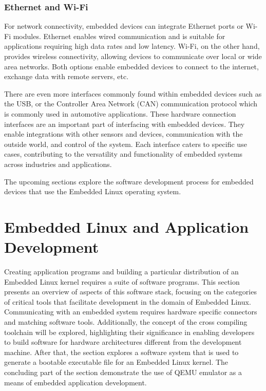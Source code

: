\subsubsection{Ethernet and Wi-Fi}

For network connectivity, embedded devices can integrate Ethernet ports or Wi-Fi modules. Ethernet enables wired communication and is suitable for applications requiring high data rates and low latency. Wi-Fi, on the other hand, provides wireless connectivity, allowing devices to communicate over local or wide area networks. Both options enable embedded devices to connect to the internet, exchange data with remote servers, etc.

There are even more interfaces commonly found within embedded devices such as the USB, or the Controller Area Network (CAN) communication protocol which is commonly used in automotive applications. These hardware connection interfaces are an important part of interfacing with embedded devices. They enable integrations with other sensors and devices, communication with the outside world, and control of the system. Each interface caters to specific use cases, contributing to the versatility and functionality of embedded systems across industries and applications.

The upcoming sections explore the software development process for embedded devices that use the Embedded Linux operating system.

\section{Embedded Linux and Application Development}

Creating application programs and building a particular distribution of an Embedded Linux kernel requires a suite of software programs. This section presents an overview of aspects of this software stack, focusing on the categories of critical tools that facilitate development in the domain of Embedded Linux. Communicating with an embedded system requires hardware specific connectors and matching software tools. Additionally, the concept of the cross compiling toolchain will be explored, highlighting their significance in enabling developers to build software for hardware architectures different from the development machine. After that, the section explores a software system that is used to generate a bootable executable file for an Embedded Linux kernel. The concluding part of the section demonstrate the use of QEMU emulator as a means of embedded application development.

